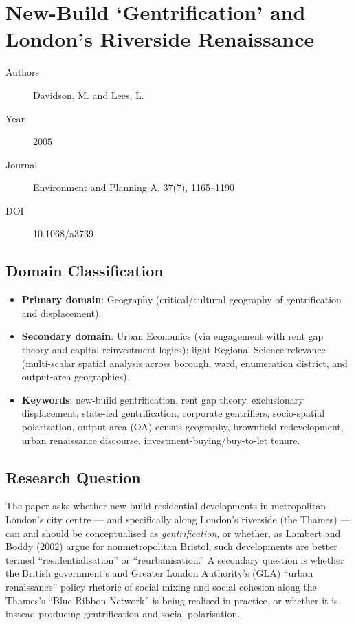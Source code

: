 \section{New-Build `Gentrification' and London's Riverside Renaissance}

\begin{description}
  \item[Authors] Davidson, M. and Lees, L.
  \item[Year] 2005
  \item[Journal] Environment and Planning A, 37(7), 1165--1190
  \item[DOI] 10.1068/a3739
\end{description}

\subsection*{Domain Classification}

\begin{itemize}
  \item \textbf{Primary domain}: Geography (critical/cultural geography of gentrification and displacement).
  \item \textbf{Secondary domain}: Urban Economics (via engagement with rent gap theory and capital reinvestment logics); light Regional Science relevance (multi-scalar spatial analysis across borough, ward, enumeration district, and output-area geographies).
  \item \textbf{Keywords}: new-build gentrification, rent gap theory, exclusionary displacement, state-led gentrification, corporate gentrifiers, socio-spatial polarization, output-area (OA) census geography, brownfield redevelopment, urban renaissance discourse, investment-buying/buy-to-let tenure.
\end{itemize}

\subsection*{Research Question}

The paper asks whether new-build residential developments in metropolitan London's city centre --- and specifically along London's riverside (the Thames) --- can and should be conceptualised as \emph{gentrification}, or whether, as Lambert and Boddy (2002) argue for nonmetropolitan Bristol, such developments are better termed ``residentialisation'' or ``reurbanisation.'' A secondary question is whether the British government's and Greater London Authority's (GLA) ``urban renaissance'' policy rhetoric of social mixing and social cohesion along the Thames's ``Blue Ribbon Network'' is being realised in practice, or whether it is instead producing gentrification and social polarisation.

